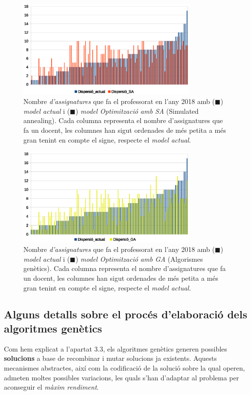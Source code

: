 \documentclass[10pt,twocolumn]{article}
\begin{document}
	\begin{figure}[!]
		\centering
		\includegraphics[width=9cm]{disp_sorted_sa}
		\caption{ \small Nombre \textit{d'assignatures} que fa el professorat en l'any 2018 amb  ({\color{blue!70}$\blacksquare$}) \textit{model actual} i ({\color{orange!70!red!90}$\blacksquare$}) \textit{model Optimització amb SA} (Simulated annealing). Cada columna representa el nombre d'assignatures que fa un docent, les columnes han sigut ordenades de més petita a més gran tenint en compte el signe, respecte el \textit{model actual}. }
		\label{fig:sor}
	\end{figure}
	\begin{figure}[!]
		\centering
		\includegraphics[width=9cm]{disp_sorted_ga}
		\caption{ \small  Nombre \textit{d'assignatures} que fa el professorat en l'any 2018 amb  ({\color{blue!70}$\blacksquare$}) \textit{model actual} i ({\color{yellow!70!gray!90}$\blacksquare$}) \textit{model Optimització amb GA} (Algorismes genètics). Cada columna representa el nombre d'assignatures que fa un docent, les columnes han sigut ordenades de més petita a més gran tenint en compte el signe, respecte el \textit{model actual}. }
		\label{fig:sorted_mo}
	\end{figure}
\newpage
\subsection{Alguns detalls sobre el procés d'elaboració dels algoritmes genètics}
\normalsize
Com hem explicat a l'apartat 3.3, els algoritmes genètics generen possibles \textbf{solucions} a base de recombinar i mutar solucions ja existents\cite{ga}. Aquests mecanismes abstractes, així com la codificació de la solució sobre la qual operen, admeten moltes possibles variacions, les quals s'han d'adaptar al problema per aconseguir el \textit{màxim rendiment}.
\end{document}

